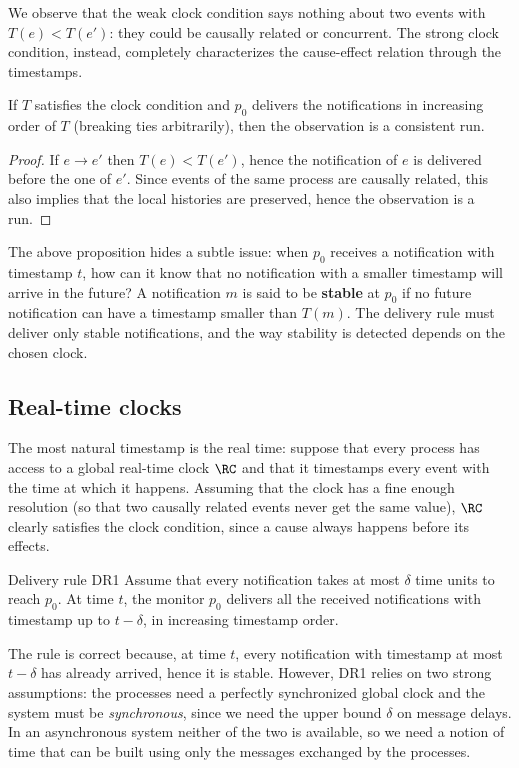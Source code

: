 We observe that the weak clock condition says nothing about two events with $T(e) < T(e')$: they could be causally related or concurrent. The strong clock condition, instead, completely characterizes the cause-effect relation through the timestamps.

\begin{framedprop}[label={prop:increasing-order}]{}
  If $T$ satisfies the clock condition and $p_0$ delivers the notifications in increasing order of $T$ (breaking ties arbitrarily), then the observation is a consistent run.
\end{framedprop}

\begin{proof}
  If $e \to e'$ then $T(e) < T(e')$, hence the notification of $e$ is delivered before the one of $e'$. Since events of the same process are causally related, this also implies that the local histories are preserved, hence the observation is a run.
\end{proof}

The above proposition hides a subtle issue: when $p_0$ receives a notification with timestamp $t$, how can it know that no notification with a smaller timestamp will arrive in the future? A notification $m$ is said to be \textbf{stable} at $p_0$ if no future notification can have a timestamp smaller than $T(m)$. The delivery rule must deliver only stable notifications, and the way stability is detected depends on the chosen clock.

\subsection{Real-time clocks}

The most natural timestamp is the real time: suppose that every process has access to a global real-time clock $\RC$ and that it timestamps every event with the time at which it happens. Assuming that the clock has a fine enough resolution (so that two causally related events never get the same value), $\RC$ clearly satisfies the clock condition, since a cause always happens before its effects.

\begin{frameddefn}{Delivery rule DR1}
  Assume that every notification takes at most $\delta$ time units to reach $p_0$. At time $t$, the monitor $p_0$ delivers all the received notifications with timestamp up to $t - \delta$, in increasing timestamp order.
\end{frameddefn}

The rule is correct because, at time $t$, every notification with timestamp at most $t - \delta$ has already arrived, hence it is stable. However, DR1 relies on two strong assumptions: the processes need a perfectly synchronized global clock and the system must be \textit{synchronous}, since we need the upper bound $\delta$ on message delays. In an asynchronous system neither of the two is available, so we need a notion of time that can be built using only the messages exchanged by the processes.

